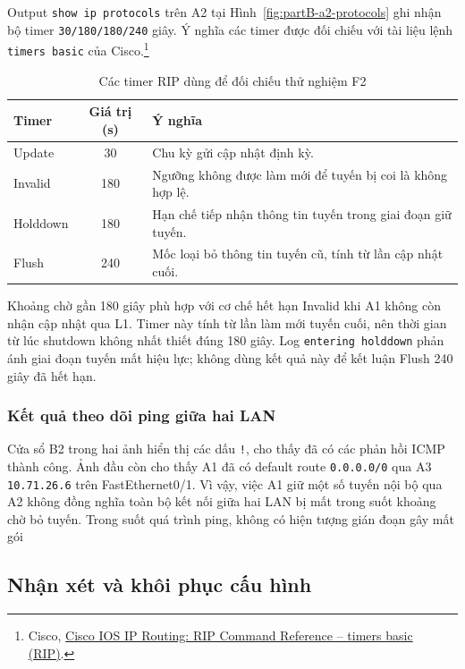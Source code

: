 Output \texttt{show ip protocols} trên A2 tại
Hình~\ref{fig:partB-a2-protocols} ghi nhận bộ timer
\texttt{30/180/180/240} giây. Ý nghĩa các timer được
đối chiếu với tài liệu lệnh \texttt{timers basic} của Cisco.\footnote{Cisco,
\href{https://www.cisco.com/c/en/us/td/docs/ios/iproute_rip/command/reference/irr_book/irr_rip.html}
{Cisco IOS IP Routing: RIP Command Reference -- timers basic (RIP)}.}

\begin{table}[H]
\centering
\caption{Các timer RIP dùng để đối chiếu thử nghiệm F2}
\label{tab:F2-timers}
\small
\renewcommand{\arraystretch}{1.3}
\begin{tabularx}{\textwidth}{l c X}
\toprule
\textbf{Timer} & \textbf{Giá trị (s)} & \textbf{Ý nghĩa} \\
\midrule
Update & 30 & Chu kỳ gửi cập nhật định kỳ. \\
Invalid & 180 & Ngưỡng không được làm mới để tuyến bị coi là không hợp lệ. \\
Holddown & 180 & Hạn chế tiếp nhận thông tin tuyến trong giai đoạn giữ tuyến. \\
Flush & 240 & Mốc loại bỏ thông tin tuyến cũ, tính từ lần cập nhật cuối. \\
\bottomrule
\end{tabularx}
\end{table}

Khoảng chờ gần 180 giây phù hợp với cơ chế hết hạn
Invalid khi A1 không còn nhận cập nhật qua L1.
Timer này tính từ lần làm mới tuyến cuối, nên thời gian
từ lúc shutdown không nhất thiết đúng 180 giây.
Log \texttt{entering holddown} phản ánh giai đoạn
tuyến mất hiệu lực; không dùng kết quả này để kết luận
Flush 240 giây đã hết hạn.

\subsubsection{Kết quả theo dõi ping giữa hai LAN}

Cửa sổ B2 trong hai ảnh hiển thị các dấu \texttt{!},
cho thấy đã có các phản hồi ICMP thành công.
Ảnh đầu còn cho thấy A1 đã có default route
\texttt{0.0.0.0/0} qua A3 \texttt{10.71.26.6}
trên FastEthernet0/1.
Vì vậy, việc A1 giữ một số tuyến nội bộ qua A2
không đồng nghĩa toàn bộ kết nối giữa hai LAN bị mất
trong suốt khoảng chờ bỏ tuyến. Trong suốt quá trình ping, không có hiện tượng gián đoạn gây mất gói


\subsection{Nhận xét và khôi phục cấu hình}

